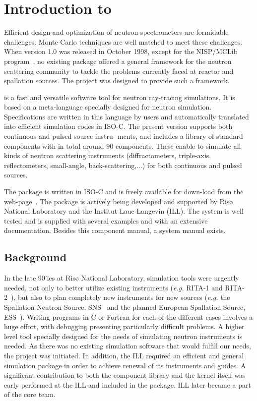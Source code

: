  
\chapter{Introduction to \MCS}

Efficient design and optimization of neutron spectrometers are
formidable challenges. Monte Carlo techniques are well matched to meet
these challenges. When \MCS version 1.0 was released in October
1998, except for the NISP/MCLib program~\cite{nisp_webpage}, no existing package offered a general framework for the neutron
scattering community to tackle the problems currently faced at reactor and
spallation sources. The \MCS project was designed to provide such a framework.

\MCS %
is a fast and versatile software tool for neutron ray-tracing simulations.
It is based on a meta-language specially designed for neutron
simulation. Specifications are written in this language by users and
automatically translated into efficient simulation codes in ISO-C.
The present version supports both continuous and pulsed source instru-
ments, and includes a library of standard
components with in total around 90 components. These enable to simulate all kinds of neutron scattering instruments (diffractometers, triple-axis, reflectometers, small-angle, back-scattering,...) for both continuous and pulsed sources.

The \MCS package is written in ISO-C and is freely available for down-load
from the \MCS web-page~\cite{mcstas_webpage}. The package is actively
being developed and supported by Risø National Laboratory 
and the Institut Laue Langevin (ILL). 
The system is well tested and
is supplied with several examples and with an extensive documentation.
Besides this component manual, a system manual exists.


\section{Background}

In the late 90'ies at Risø National Laboratory, 
simulation tools were urgently needed,
not only to better utilize existing instruments
({\em e.g.} RITA-1 and RITA-2~\cite{cjp_73_697,pb_241_50,pb_283_343}), 
but also to plan completely new instruments for new sources 
({\em e.g.} the Spallation Neutron Source, SNS~\cite{sns_webpage} 
and the planned European Spallation Source, ESS~\cite{ess_webpage}). 
Writing programs in C or Fortran for
each of the different cases involves a huge effort, with debugging presenting
particularly difficult problems. A higher level tool specially designed
for the needs of simulating neutron instruments is needed. As there was
no existing simulation software that would fulfill our needs, the \MCS 
project was initiated.
In addition, the ILL required an efficient and general simulation
package in order to achieve renewal of its instruments and guides. 
A significant contribution to both the component library and the \MCS 
kernel itself was early performed at the ILL and included in the package.
ILL later became a part of the core \MCS team.

